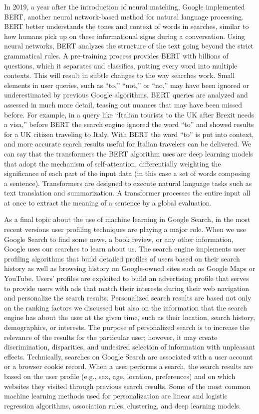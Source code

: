 In 2019, a year after the introduction of neural matching, Google implemented BERT, another neural network-based method for natural language processing. BERT better understands the tones and context of words in searches, similar to how humans pick up on these informational signs during a conversation. Using neural networks, BERT analyzes the structure of the text going beyond the strict grammatical rules. A pre-training process provides BERT with billions of questions, which it separates and classifies, putting every word into multiple contexts. This will result in subtle changes to the way searches work. Small elements in user queries, such as ``to,'' ``not,'' or ``no,'' may have been ignored or underestimated by previous Google algorithms. BERT queries are analyzed and assessed in much more detail, teasing out nuances that may have been missed before. For example, in a query like ``\hbox{Italian} tourists to the UK after Brexit needs a visa,'' before BERT the search engine ignored the word ``to'' and showed results for a UK citizen traveling to Italy. With BERT the word ``to'' is put into context, and more accurate search results useful for Italian travelers can be delivered. We can say that the transformers the BERT algorithm uses are deep learning models that adopt the mechanism of self-attention, differentially weighting the significance of each part of the input data (in this case a set of words composing a sentence). Transformers are designed to execute natural language tasks such as text translation and summarization. A transformer processes the entire input all at once to extract the meaning of a sentence by a global evaluation.

As a final topic about the use of machine learning in Google Search, in the most recent versions user profiling techniques are playing a major role. When we use Google Search to find some news, a book review, or any other information, Google uses our searches to learn about us. The search engine implements user profiling algorithms that build detailed profiles of users based on their search history as well as browsing history on Google-owned sites such as Google Maps or YouTube. Users' profiles are exploited to build an advertising profile that serves to provide users with ads that match their interests during their web navigation and personalize the search results. Personalized search results are based not only on the ranking factors we discussed but also on the information that the search engine has about the user at the given time, such as their location, search history, demographics, or interests. The purpose of personalized search is to increase the relevance of the results for the particular user; however, it may create discrimination, disparities, and undesired selection of information with unpleasant effects. Technically, searches on Google Search are associated with a user account or a browser cookie record. When a user performs a search, the search results are based on the user profile (e.g., sex, age, location, preferences) and on which websites they visited through previous search results. Some of the most common machine learning methods used for personalization are linear and logistic regression algorithms, association rules, clustering, and deep learning models.

